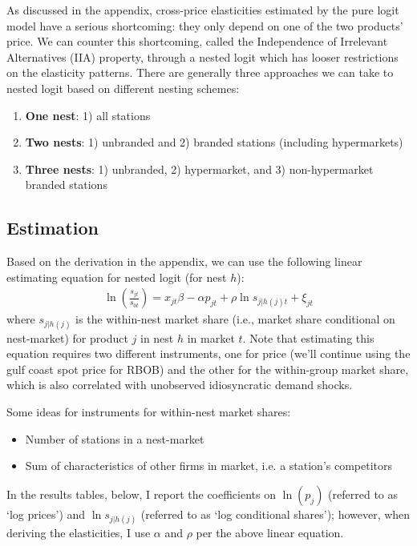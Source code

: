 \documentclass{article}
\begin{document}
As discussed in the appendix, cross-price elasticities estimated by the pure logit model have a serious shortcoming: they only depend on one of the two products' price. We can counter this shortcoming, called the Independence of Irrelevant Alternatives (IIA) property, through a nested logit which has looser restrictions on the elasticity patterns. There are generally three approaches we can take to nested logit based on different nesting schemes:
\begin{enumerate}
	\item \textbf{One nest}: 1) all stations
	\item \textbf{Two nests}: 1) unbranded and 2) branded stations (including hypermarkets)
	\item \textbf{Three nests}: 1) unbranded, 2) hypermarket, and 3) non-hypermarket branded stations
\end{enumerate}

\subsection{Estimation}
Based on the derivation in the appendix, we can use the following linear estimating equation for nested logit (for nest $h$):
\begin{gather}
	\ln(\frac{s_{jt}}{s_{0t}}) = x_{jt} \beta - \alpha p_{jt} + \rho \ln s_{j | h(j) t} + \xi_{jt} 
\end{gather}
where $s_{j | h(j)}$ is the within-nest market share (i.e., market share conditional on nest-market) for product $j$ in nest $h$ in market $t$. Note that estimating this equation requires two different instruments, one for price (we'll continue using the gulf coast spot price for RBOB) and the other for the within-group market share, which is also correlated with unobserved idiosyncratic demand shocks.

Some ideas for instruments for within-nest market shares:
\begin{itemize}
	\item Number of stations in a nest-market
	\item Sum of characteristics of other firms in market, i.e. a station's competitors
\end{itemize}

In the results tables, below, I report the coefficients on $\ln(p_j)$ (referred to as `log prices') and $\ln s_{j | h(j)}$ (referred to as `log conditional shares'); however, when deriving the elasticities, I use $\alpha$ and $\rho$ per the above linear equation.
\end{document}
